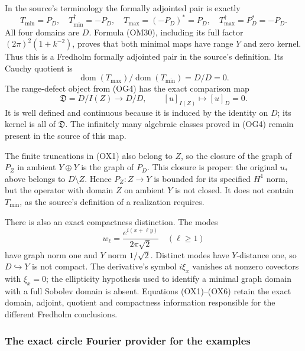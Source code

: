 \documentclass[
  11pt,
]{article}
\makeatletter
\let\ReaderOriginalAnchorStart\hyper@anchorstart
\let\ReaderOriginalAnchorEnd\hyper@anchorend
\let\ReaderPendingAliases\@empty
\def\ReaderArmAliases#1{\gdef\ReaderPendingAliases{#1}}
\def\hyper@anchorstart#1{\ReaderIfNativeAnchorTF{#1}{\ReaderPendingAliases\global\let\ReaderPendingAliases\@empty}{}\ReaderOriginalAnchorStart{#1}}
\makeatother
\begin{document}
In the source's terminology the formally adjointed pair is exactly \[
T_{\min}=P_D,\quad T_{\min}^{\dagger}=-P_D,
\quad T_{\max}=(-P_D)^*=P_D,
\quad T_{\max}^{\dagger}=P_D^*=-P_D.
\tag{OX3}
\] All four domains are \(D\). Formula (OM30), including its full factor
\((2\pi)^2(1+k^{-2})\), proves that both minimal maps have range \(Y\)
and zero kernel. Thus this is a Fredholm formally adjointed pair in the
source's definition. Its Cauchy quotient is \[
\operatorname{dom}(T_{\max})/
\operatorname{dom}(T_{\min})=D/D=0.
\tag{OX4}
\] The range-defect object from (OG4) has the exact comparison map \[
\mathfrak D=D/I(Z)\longrightarrow D/D,
\qquad[u]_{I(Z)}\longmapsto[u]_D=0.
\tag{OX5}
\] It is well defined and continuous because it is induced by the
identity on \(D\); its kernel is all of \(\mathfrak D\). The infinitely
many algebraic classes proved in (OG4) remain present in the source of
this map.

The finite truncations in (OX1) also belong to \(Z\), so the closure of
the graph of \(P_Z\) in ambient \(Y\oplus Y\) is the graph of \(P_D\).
This closure is proper: the original \(u_*\) above belongs to
\(D\setminus Z\). Hence \(P_Z:Z\to Y\) is bounded for its specified
\(H^1\) norm, but the operator with domain \(Z\) on ambient \(Y\) is not
closed. It does not contain \(T_{\min}\), as the source's definition of
a realization requires.

There is also an exact compactness distinction. The modes \[
w_\ell=\frac{e^{i(x+\ell y)}}{2\pi\sqrt2}
\quad(\ell\ge1)
\tag{OX6}
\] have graph norm one and \(Y\) norm \(1/\sqrt2\). Distinct modes have
\(Y\)-distance one, so \(D\hookrightarrow Y\) is not compact. The
derivative's symbol \(i\xi_x\) vanishes at nonzero covectors with
\(\xi_x=0\); the ellipticity hypothesis used to identify a minimal graph
domain with a full Sobolev domain is absent. Equations (OX1)--(OX6)
retain the exact domain, adjoint, quotient and compactness information
responsible for the different Fredholm conclusions.

\ReaderArmAliases{\ReaderOriginalAnchorStart{the-exact-circle-fourier-provider-for-the-examples}\ReaderOriginalAnchorEnd}
\subsubsection{The exact circle Fourier provider for the
examples}\label{the-exact-circle-fourier-provider-for-the-examples}
\end{document}
